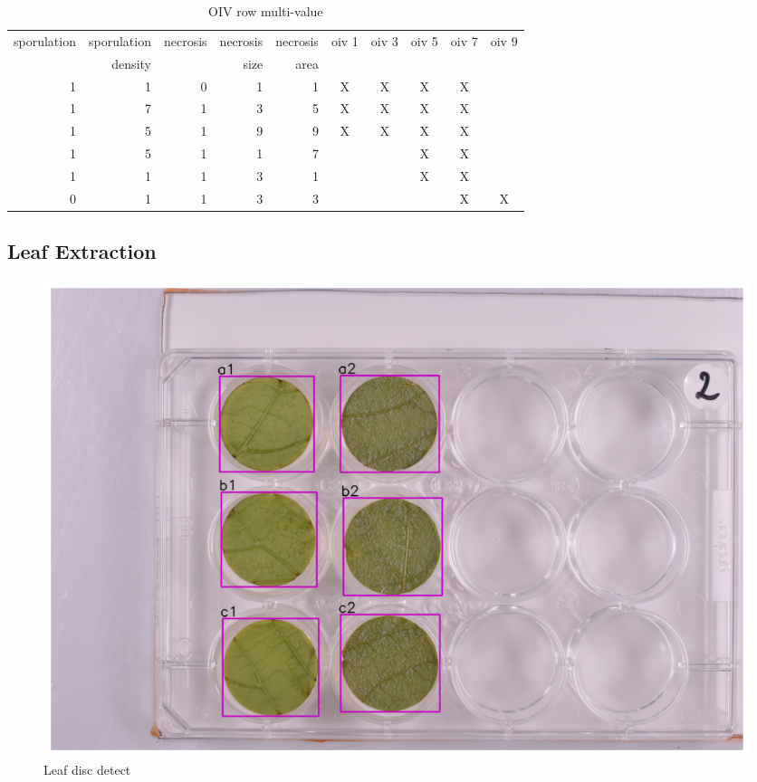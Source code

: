 \documentclass[english]{article}
\begin{document}
\begin{table}[H]
	\centering
	\caption{OIV row multi-value}\label{tab:oivconfusion}
	\begin{tabular}{rrrrrccccc}
		\toprule
		sporulation & sporulation & necrosis & necrosis & necrosis & oiv 1 & oiv 3 & oiv 5 & oiv 7 & oiv 9 \\
		{}          & density     & {}       & size     & area     & {}    & {}    & {}    & {}    & {}    \\
		\midrule
		1           & 1           & 0        & 1        & 1        & X     & X     & X     & X     &       \\
		1           & 7           & 1        & 3        & 5        & X     & X     & X     & X     &       \\
		1           & 5           & 1        & 9        & 9        & X     & X     & X     & X     &       \\
		1           & 5           & 1        & 1        & 7        &       &       & X     & X     &       \\
		1           & 1           & 1        & 3        & 1        &       &       & X     & X     &       \\
		0           & 1           & 1        & 3        & 3        &       &       &       & X     & X     \\
		\bottomrule
	\end{tabular}
\end{table}

\subsection{Leaf Extraction}

\begin{figure}
	\centering
	\includegraphics[width=0.8\linewidth]{plate_index_v2_fixed.png}
	\caption*{Leaf disc detect }
\end{figure}
\end{document}
